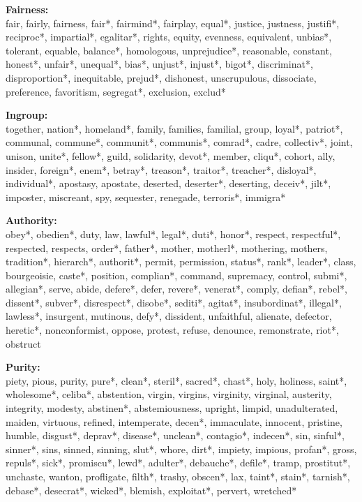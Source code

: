\documentclass[12pt]{article}
\begin{document}
\textbf{Fairness:}\\
fair, fairly, fairness, fair*, fairmind*, fairplay, equal*, justice, justness, justifi*, reciproc*, impartial*, egalitar*, rights, equity, evenness, equivalent, unbias*, tolerant, equable, balance*, homologous, unprejudice*, reasonable, constant, honest*, unfair*, unequal*, bias*, unjust*, injust*, bigot*, discriminat*, disproportion*, inequitable, prejud*, dishonest, unscrupulous, dissociate, preference, favoritism, segregat*, exclusion, exclud*
\vspace{.5cm}

\textbf{Ingroup:}\\
together, nation*, homeland*, family, families, familial, group, loyal*, patriot*, communal, commune*, communit*, communis*, comrad*, cadre, collectiv*, joint, unison, unite*, fellow*, guild, solidarity, devot*, member, cliqu*, cohort, ally, insider, foreign*, enem*, betray*, treason*, traitor*, treacher*, disloyal*, individual*, apostasy, apostate, deserted, deserter*, deserting, deceiv*, jilt*, imposter, miscreant, spy, sequester, renegade, terroris*, immigra*
\vspace{.5cm}

\textbf{Authority:}\\
obey*, obedien*, duty, law, lawful*, legal*, duti*, honor*, respect, respectful*, respected, respects, order*, father*, mother, motherl*, mothering, mothers, tradition*, hierarch*, authorit*, permit, permission, status*, rank*, leader*, class, bourgeoisie, caste*, position, complian*, command, supremacy, control, submi*, allegian*, serve, abide, defere*, defer, revere*, venerat*, comply, defian*, rebel*, dissent*, subver*, disrespect*, disobe*, sediti*, agitat*, insubordinat*, illegal*, lawless*, insurgent, mutinous, defy*, dissident, unfaithful, alienate, defector, heretic*, nonconformist, oppose, protest, refuse, denounce, remonstrate, riot*, obstruct
\vspace{.5cm}

\textbf{Purity:}\\
piety, pious, purity, pure*, clean*, steril*, sacred*, chast*, holy, holiness, saint*, wholesome*, celiba*, abstention, virgin, virgins, virginity, virginal, austerity, integrity, modesty, abstinen*, abstemiousness, upright, limpid, unadulterated, maiden, virtuous, refined, intemperate, decen*, immaculate, innocent, pristine, humble, disgust*, deprav*, disease*, unclean*, contagio*, indecen*, sin, sinful*, sinner*, sins, sinned, sinning, slut*, whore, dirt*, impiety, impious, profan*, gross, repuls*, sick*, promiscu*, lewd*, adulter*, debauche*, defile*, tramp, prostitut*, unchaste, wanton, profligate, filth*, trashy, obscen*, lax, taint*, stain*, tarnish*, debase*, desecrat*, wicked*, blemish, exploitat*, pervert, wretched*
\vspace{.5cm}
\end{document}
